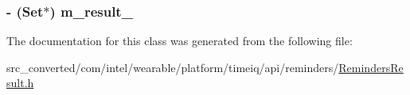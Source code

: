 \subsubsection[{m\+\_\+result\+\_\+}]{\setlength{\rightskip}{0pt plus 5cm}-\/ (Set$\ast$) m\+\_\+result\+\_\+}\label{interface_reminders_result_a65a7f0e499f7c9e56b99e9b7befe14ea}


The documentation for this class was generated from the following file\+:\begin{DoxyCompactItemize}
\item 
src\+\_\+converted/com/intel/wearable/platform/timeiq/api/reminders/\hyperlink{_reminders_result_8h}{Reminders\+Result.\+h}\end{DoxyCompactItemize}
